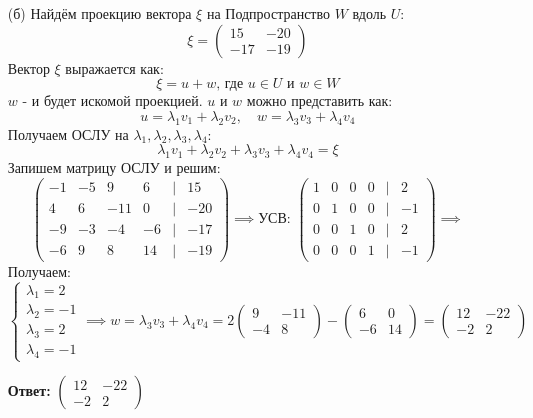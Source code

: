 \documentclass[a4paper]{article}
\newcommand{\mat}[1]{\begin{pmatrix} #1 \end{pmatrix}}
\newcommand{\case}[1]{\begin{cases} #1 \end{cases}}
\begin{document}
\begin{enumerate}
\begin{enumerate}
        \item[(б)] Найдём проекцию вектора $\xi$ на Подпространство $W$ вдоль $U$:
        $$\xi = \mat{15 & -20 \\ -17 &-19}$$
        Вектор $\xi$ выражается как:
        $$\xi = u + w \text{, где $u \in U$ и $w \in W$}$$
        $w$ - и будет искомой проекцией. $u$ и $w$ можно представить как:
        $$u = \lambda_1 v_1 + \lambda_2 v_2, \quad w = \lambda_3v_3 + \lambda_4 v_4$$
        Получаем ОСЛУ на $\lambda_1, \lambda_2, \lambda_3, \lambda_4$:
        $$\lambda_1 v_1 + \lambda_2 v_2 + \lambda_3v_3 + \lambda_4 v_4 = \xi$$
        Запишем матрицу ОСЛУ и решим:
        $$\mat{-1 & -5& 9 & 6 &|& 15\\
        4 & 6 & -11 &0  &|& -20\\
        -9 & -3 & -4 & -6 &|& -17\\
        -6 & 9 & 8 & 14 &|& -19} \implies \text{УСВ: } \begin{pmatrix}
            1 & 0 & 0 & 0 & |&2 \\
            0 & 1 & 0 & 0 &|& -1 \\
            0 & 0 & 1 & 0 &|& 2 \\
            0 & 0 & 0 & 1 &|& -1
            \end{pmatrix}\implies$$
        Получаем:
        $$
        \case{
            \lambda_1 = 2\\
            \lambda_2 = -1\\
            \lambda_3 = 2\\
            \lambda_4 = -1}
        \implies w = \lambda_3v_3 + \lambda_4 v_4 = 2 \mat{9 & -11 \\ -4 & 8} - \mat{6 & 0 \\ -6 & 14} = \begin{pmatrix}
            12 & -22 \\
            -2 & 2
            \end{pmatrix}$$

        \textbf{Ответ:} $\begin{pmatrix}
            12 & -22 \\
            -2 & 2
            \end{pmatrix}$ 
        

    \end{enumerate}


    \end{enumerate}
\end{document}
